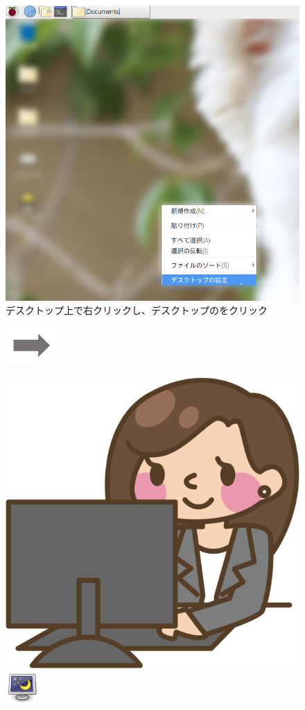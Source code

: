 \begin{figure}
  \begin{minipage}{0.4\textwidth}
    \includegraphics[width=\linewidth]{text01-img/textbook-img107.png}
     デスクトップ上で右クリックし、デスクトップのをクリック
  \end{minipage}
  \includegraphics[width=2cm]{text01-img/textbook-img073.png}
  \begin{minipage}{0.4\textwidth}
    \includegraphics[width=0.4\linewidth]{text01-img/textbook-img082.png}
    \hfill
    \includegraphics[width=0.4\linewidth]{text01-img/textbook-img106.png}

\end{minipage}
\end{figure}
